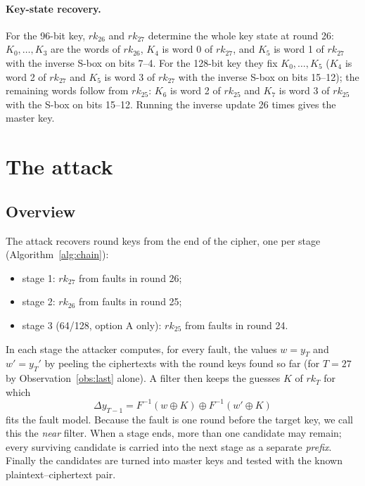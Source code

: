 \documentclass[pdflatex,sn-mathphys-num]{sn-jnl}
\theoremstyle{thmstyleone}%
\theoremstyle{thmstylethree}%
\newcommand{\rk}{\mathit{rk}}
\newcommand{\Finv}{F^{-1}}
\begin{document}
\paragraph{Key-state recovery.} For the 96-bit key, $\rk_{26}$ and $\rk_{27}$ determine the whole key
state at round 26: $K_0,\dots,K_3$ are the words of $\rk_{26}$, $K_4$ is word 0 of $\rk_{27}$, and $K_5$ is
word 1 of $\rk_{27}$ with the inverse S-box on bits 7--4. For the 128-bit key they fix
$K_0,\dots,K_5$ ($K_4$ is word 2 of $\rk_{27}$ and $K_5$ is word 3 of $\rk_{27}$ with the inverse
S-box on bits 15--12); the remaining words follow from $\rk_{25}$: $K_6$ is word 2 of $\rk_{25}$ and
$K_7$ is word 3 of $\rk_{25}$ with the S-box on bits 15--12. Running the inverse update 26 times gives
the master key.

\section{The attack}\label{sec:attack}

\subsection{Overview}

The attack recovers round keys from the end of the cipher, one per stage (Algorithm~\ref{alg:chain}):
\begin{itemize}
\item stage 1: $\rk_{27}$ from faults in round 26;
\item stage 2: $\rk_{26}$ from faults in round 25;
\item stage 3 (64/128, option A only): $\rk_{25}$ from faults in round 24.
\end{itemize}
In each stage the attacker computes, for every fault, the values $w=y_T$ and $w'=y_T'$ by peeling the
ciphertexts with the round keys found so far (for $T=27$ by Observation~\ref{obs:last} alone). A
filter then keeps the guesses $K$ of $\rk_T$ for which
\begin{equation}\label{eq:check}
\Delta y_{T-1} = \Finv(w\oplus K)\oplus\Finv(w'\oplus K)
\end{equation}
fits the fault model. Because the fault is one round before the target key, we call this the
\emph{near} filter. When a stage ends, more than one candidate may remain; every surviving candidate
is carried into the next stage as a separate \emph{prefix}. Finally the candidates are turned into
master keys and tested with the known plaintext--ciphertext pair.
\end{document}

